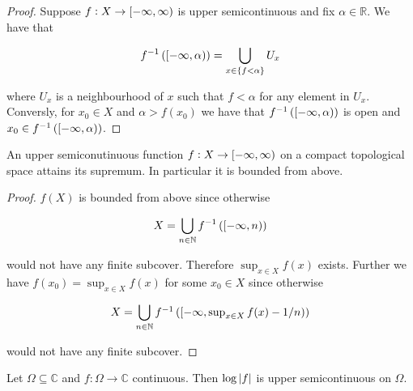 \begin{proof}
	Suppose $f: X \to \intco[0]{-\infty,\infty}$ is upper semicontinuous and fix $\alpha \in \mathbb{R}$. We have that 

		\begin{equation*}
			f^{-1}\del[0]{ \intco[0]{-\infty,\alpha}} = \bigcup_{x \in \cbr[0]{ f < \alpha }} U_x
		\end{equation*}

		\noindent where $U_x$ is a neighbourhood of $x$ such that $f < \alpha$ for any element in $U_x$. Conversly, for $x_0 \in X$ and $\alpha > f(x_0)$ we have that $f^{-1}\del[0]{ \intco[0]{-\infty,\alpha }}$ is open and $x_0 \in f^{-1}\del[0]{\intco[0]{-\infty,\alpha}}$.
\end{proof}

\begin{lemma*}
	An upper semiconutinuous function $f: X \to \intco[0]{-\infty,\infty}$ on a compact topological space attains its supremum. In particular it is bounded from above.
	\label{lem:semicom}
\end{lemma*}

\begin{proof}
	 $f(X)$ is bounded from above since otherwise

	\begin{equation*}
		X = \bigcup_{n \in \mathbb{N}} f^{-1}\del[0]{\intco[0]{-\infty,n}}
	\end{equation*}

	\noindent would not have any finite subcover. Therefore $\sup_{x \in X}f(x)$ exists. Further we have $f(x_0) = \sup_{x \in X}f(x)$ for some $x_0 \in X$ since otherwise

	\begin{equation*}
		X = \bigcup_{n \in \mathbb{N}} \textstyle f^{-1}\del[0]{\intco[0]{-\infty,\sup_{x \in X}f(x) - 1/n}}
	\end{equation*}

	\noindent would not have any finite subcover.	
\end{proof}

\begin{lemma}
	Let $\Omega \subseteq \mathbb{C}$ and $f: \Omega \to \mathbb{C}$ continuous. Then $\log\abs[0]{ f}$ is upper semicontinuous on $\Omega$.
	\label{lem:uppersemcont}
\end{lemma}

